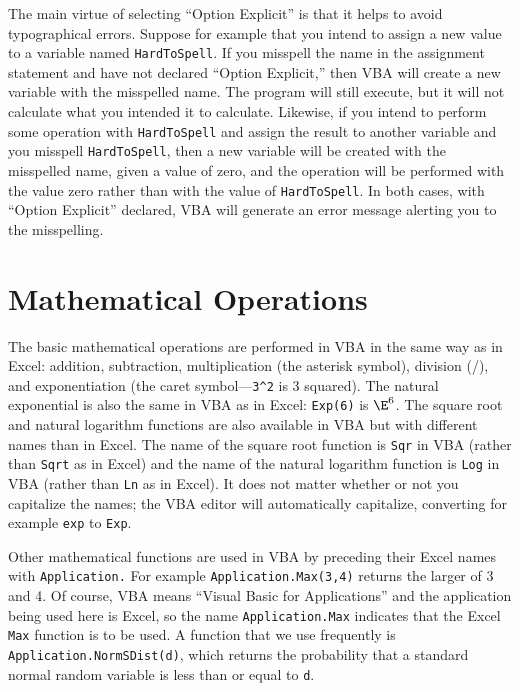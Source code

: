 The main virtue of selecting ``Option Explicit'' is that it helps to avoid typographical errors.  Suppose for example that you intend to assign a new value to a variable named \verb!HardToSpell!.  If you misspell the name in the assignment statement and have not declared ``Option Explicit,'' then VBA will create a new variable with the misspelled name.  The program will still execute, but it will not calculate what you intended it to calculate.  Likewise, if you intend to perform some operation with \verb!HardToSpell! and assign the result to another variable and you misspell \verb!HardToSpell!, then a new variable will be created with the misspelled name, given a value of zero, and the operation will be performed with the value zero rather than with the value of \verb!HardToSpell!.  In both cases, with ``Option Explicit'' declared, VBA will generate an error message alerting you to the misspelling.

\section{Mathematical Operations}

The basic mathematical operations are performed in VBA in the same way as in Excel: addition, subtraction, multiplication (the asterisk symbol), division (/), and exponentiation (the caret symbol---\verb!3^2! is 3 squared).  The natural exponential is also the same in VBA as in Excel: \verb!Exp(6)! is $\E^6$.  The square root and natural logarithm functions are also available in VBA but with different names than in Excel.  The name of the square root function is \verb!Sqr! in VBA (rather than \verb!Sqrt! as in Excel) and the name of the natural logarithm function is \verb!Log! in VBA (rather than \verb!Ln! as in Excel).  It does not matter whether or not  you capitalize the names; the VBA editor will automatically capitalize, converting for example \verb!exp! to \verb!Exp!.

Other mathematical functions are used in VBA by preceding their Excel names with \verb!Application.!  For example \verb!Application.Max(3,4)! returns the larger of 3 and 4.  Of course, VBA means ``Visual Basic for Applications'' and the application being used here is Excel, so the name \verb!Application.Max! indicates that the Excel \verb!Max! function is to be used.  A function that we use frequently is \verb!Application.NormSDist(d)!, which returns the probability that a standard normal random variable is less than or equal to \verb!d!.

